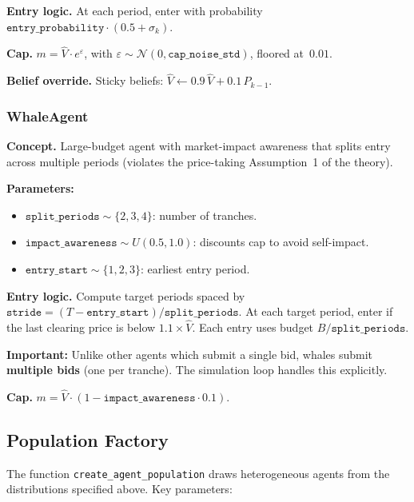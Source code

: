 \documentclass[11pt,a4paper]{article}
\begin{document}
\textbf{Entry logic.}  At each period, enter with probability $\texttt{entry\_probability}\cdot(0.5 + \sigma_k)$.

\textbf{Cap.}  $m = \hat{V}\cdot e^{\varepsilon}$, with $\varepsilon \sim \mathcal{N}(0, \texttt{cap\_noise\_std})$, floored at~$0.01$.

\textbf{Belief override.}  Sticky beliefs: $\hat{V} \leftarrow 0.9\,\hat{V} + 0.1\,P_{k-1}$.


\subsubsection{WhaleAgent}
\label{sec:whale}

\textbf{Concept.}  Large-budget agent with market-impact awareness that splits entry across multiple periods (violates the price-taking Assumption~1 of the theory).

\textbf{Parameters:}
\begin{itemize}[nosep]
  \item $\texttt{split\_periods} \sim \{2,3,4\}$: number of tranches.
  \item $\texttt{impact\_awareness} \sim U(0.5,1.0)$: discounts cap to avoid self-impact.
  \item $\texttt{entry\_start} \sim \{1,2,3\}$: earliest entry period.
\end{itemize}

\textbf{Entry logic.}  Compute target periods spaced by $\texttt{stride} = (T - \texttt{entry\_start})/\texttt{split\_periods}$.  At each target period, enter if the last clearing price is below $1.1\times\hat{V}$.  Each entry uses budget $B / \texttt{split\_periods}$.

\textbf{Important:} Unlike other agents which submit a single bid, whales submit \textbf{multiple bids} (one per tranche).  The simulation loop handles this explicitly.

\textbf{Cap.}  $m = \hat{V}\cdot(1 - \texttt{impact\_awareness}\cdot 0.1)$.


\subsection{Population Factory}
\label{sec:population}

The function \texttt{create\_agent\_population} draws heterogeneous agents from the distributions specified above.  Key parameters:
\end{document}
